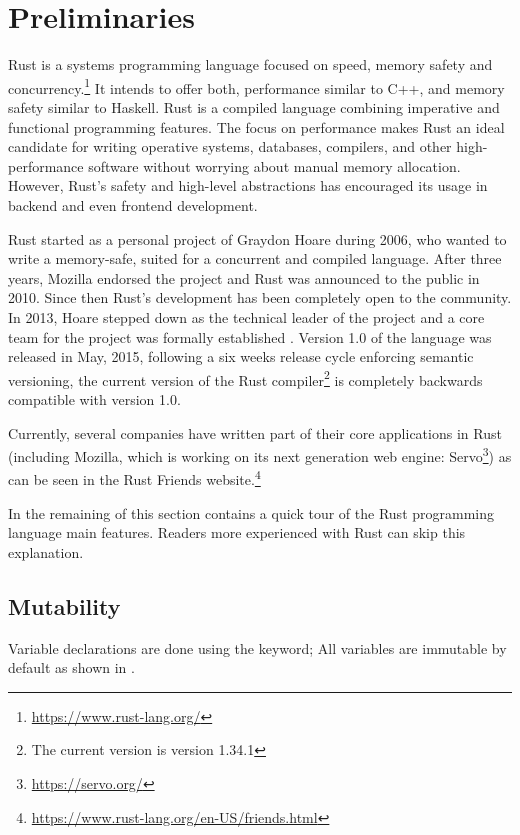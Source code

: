 \chapter{Preliminaries}

\label{chap:preliminaries}

Rust is a systems programming language focused on speed, memory safety and
concurrency.\footnote{\url{https://www.rust-lang.org/}}  It intends to offer
both, performance similar to C++, and memory safety similar to Haskell. Rust is a
compiled language combining imperative and functional programming features. The
focus on performance makes Rust an ideal candidate for writing operative
systems, databases, compilers, and other high-performance software without
worrying about manual memory allocation. However, Rust's safety and high-level
abstractions has encouraged its usage in backend and even frontend development. 

Rust started as a personal project of Graydon Hoare during 2006, who wanted to
write a memory-safe, suited for a concurrent and compiled language. After three
years, Mozilla endorsed the project and Rust was announced to the public in
2010. Since then Rust's development has been completely open to the community.
In 2013, Hoare stepped down as the technical leader of the project and a core
team for the project was formally established \cite{steve_acm}. Version 1.0 of
the language was released in May, 2015, following a six weeks release cycle
enforcing semantic versioning, the current version of the Rust
compiler\footnote{The current version is version 1.34.1} is completely
backwards compatible with version 1.0.

Currently, several companies have written part of their core
applications in Rust (including Mozilla, which is working on its next generation web
engine: Servo\footnote{\url{https://servo.org/}}) as can be seen in the
Rust Friends website.\footnote{\url{https://www.rust-lang.org/en-US/friends.html}}

In the remaining of this section contains a quick tour of the Rust programming
language main features. Readers more experienced with Rust can skip this
explanation.

\section{Mutability}

Variable declarations are done using the  keyword; All
variables are immutable by default as shown in .

